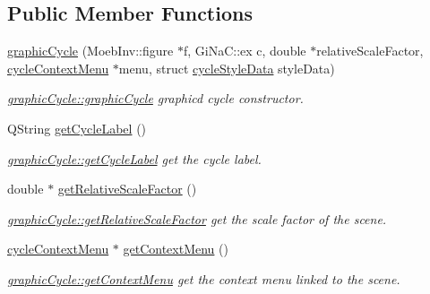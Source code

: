 \subsection*{Public Member Functions}
\begin{DoxyCompactItemize}
\item 
\mbox{\hyperlink{classgraphic_cycle_a89c2914fab32a0e10b2d53491535c173}{graphic\+Cycle}} (Moeb\+Inv\+::figure $\ast$f, Gi\+Na\+C\+::ex c, double $\ast$relative\+Scale\+Factor, \mbox{\hyperlink{classcycle_context_menu}{cycle\+Context\+Menu}} $\ast$menu, struct \mbox{\hyperlink{structcycle_style_data}{cycle\+Style\+Data}} style\+Data)
\begin{DoxyCompactList}\small\item\em \mbox{\hyperlink{classgraphic_cycle_a89c2914fab32a0e10b2d53491535c173}{graphic\+Cycle\+::graphic\+Cycle}} graphicd cycle constructor. \end{DoxyCompactList}\item 
Q\+String \mbox{\hyperlink{classgraphic_cycle_ae55bb7487a8baac738b88e8c1bd0515e}{get\+Cycle\+Label}} ()
\begin{DoxyCompactList}\small\item\em \mbox{\hyperlink{classgraphic_cycle_ae55bb7487a8baac738b88e8c1bd0515e}{graphic\+Cycle\+::get\+Cycle\+Label}} get the cycle label. \end{DoxyCompactList}\item 
double $\ast$ \mbox{\hyperlink{classgraphic_cycle_a80b533c2477a08f98506202d94bad7bc}{get\+Relative\+Scale\+Factor}} ()
\begin{DoxyCompactList}\small\item\em \mbox{\hyperlink{classgraphic_cycle_a80b533c2477a08f98506202d94bad7bc}{graphic\+Cycle\+::get\+Relative\+Scale\+Factor}} get the scale factor of the scene. \end{DoxyCompactList}\item 
\mbox{\hyperlink{classcycle_context_menu}{cycle\+Context\+Menu}} $\ast$ \mbox{\hyperlink{classgraphic_cycle_a4e090d82ba2e37bee415c95630abe061}{get\+Context\+Menu}} ()
\begin{DoxyCompactList}\small\item\em \mbox{\hyperlink{classgraphic_cycle_a4e090d82ba2e37bee415c95630abe061}{graphic\+Cycle\+::get\+Context\+Menu}} get the context menu linked to the scene. \end{DoxyCompactList}\item 
\mbox{\label{classgraphic_cycle_a10e61352945ca9b32b83e528e2fc6853}} 

\end{DoxyCompactItemize}
